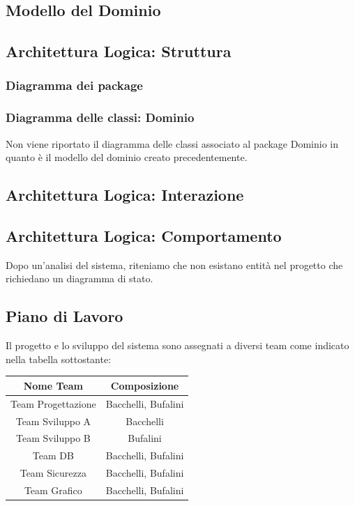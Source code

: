 \documentclass[a4paper, 11pt]{article}
\begin{document}
\clearpage
\newpage
\subsection{Modello del Dominio}
\subsection{Architettura Logica: Struttura}
\subsubsection{Diagramma dei package}
\subsubsection{Diagramma delle classi: Dominio}
Non viene riportato il diagramma delle classi associato al package Dominio in quanto è il modello del dominio creato precedentemente.
\subsection{Architettura Logica: Interazione}
\subsection{Architettura Logica: Comportamento}
Dopo un’analisi del sistema, riteniamo che non esistano entità nel progetto che richiedano un diagramma di stato.

\subsection{Piano di Lavoro}
Il progetto e lo sviluppo del sistema sono assegnati a diversi team come indicato nella tabella sottostante:
\begin{center}
    \begin{tabular}{|c|c|}
        \hline
        \textbf{Nome Team} & \textbf{Composizione} \\\hline
        Team Progettazione & Bacchelli, Bufalini \\\hline
        Team Sviluppo A & Bacchelli \\\hline
        Team Sviluppo B & Bufalini \\\hline
        Team DB & Bacchelli, Bufalini \\\hline
        Team Sicurezza & Bacchelli, Bufalini \\\hline
        Team Grafico & Bacchelli, Bufalini \\
        \hline 
    \end{tabular}
\end{center}
\end{document}
